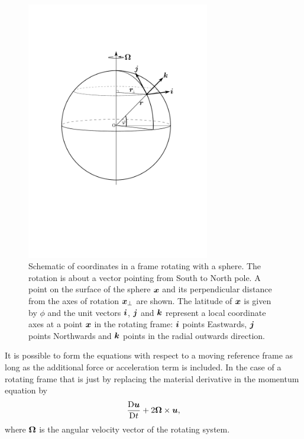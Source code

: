 \begin{figure}\label{fig:rotating_frame}
\centering
\includegraphics[width=8.0cm]{misc_images/coordinates.pdf}
\caption{Schematic of coordinates in a frame rotating with a sphere. The rotation is about a vector
pointing from South to North pole. A point on the surface of the sphere ${\mbox{\boldmath$x$}}$ and its perpendicular
distance from the axes of rotation ${\mbox{\boldmath$x$}}_{\perp}$ are shown. The latitude of ${\mbox{\boldmath$x$}}$ is given by $\phi$ 
and the unit vectors ${\mbox{\boldmath$i$}}$, ${\mbox{\boldmath$j$}}$ and ${\mbox{\boldmath$k$}}$ represent a local coordinate axes at a point ${\mbox{\boldmath$x$}}$ in the rotating
frame: ${\mbox{\boldmath$i$}}$ points Eastwards, ${\mbox{\boldmath$j$}}$ points Northwards and ${\mbox{\boldmath$k$}}$ points in the radial outwards direction.}
\end{figure}

It is possible to form the equations with respect to a moving reference frame as long as the
additional force or acceleration term is included. In the case of a rotating frame that is
just by replacing the material derivative in the momentum equation by
\begin{equation}
\frac{\mathrm{D}{\mbox{\boldmath$u$}}}{\mathrm{D} t} + 2{\mbox{\boldmath$\Omega$}}\times{\mbox{\boldmath$u$}},
\end{equation}
where ${\mbox{\boldmath$\Omega$}}$ is the angular velocity vector of the rotating
system.

